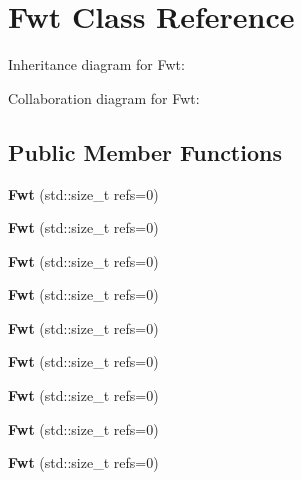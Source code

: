 \hypertarget{class_fwt}{}\section{Fwt Class Reference}
\label{class_fwt}


Inheritance diagram for Fwt\+:


Collaboration diagram for Fwt\+:
\subsection*{Public Member Functions}
\begin{DoxyCompactItemize}
\item 
\mbox{\label{class_fwt_a35327b5c50d4528169ccc0c241ba09d6}} 
{\bfseries Fwt} (std\+::size\+\_\+t refs=0)
\item 
\mbox{\label{class_fwt_a35327b5c50d4528169ccc0c241ba09d6}} 
{\bfseries Fwt} (std\+::size\+\_\+t refs=0)
\item 
\mbox{\label{class_fwt_a35327b5c50d4528169ccc0c241ba09d6}} 
{\bfseries Fwt} (std\+::size\+\_\+t refs=0)
\item 
\mbox{\label{class_fwt_a35327b5c50d4528169ccc0c241ba09d6}} 
{\bfseries Fwt} (std\+::size\+\_\+t refs=0)
\item 
\mbox{\label{class_fwt_a35327b5c50d4528169ccc0c241ba09d6}} 
{\bfseries Fwt} (std\+::size\+\_\+t refs=0)
\item 
\mbox{\label{class_fwt_a35327b5c50d4528169ccc0c241ba09d6}} 
{\bfseries Fwt} (std\+::size\+\_\+t refs=0)
\item 
\mbox{\label{class_fwt_a35327b5c50d4528169ccc0c241ba09d6}} 
{\bfseries Fwt} (std\+::size\+\_\+t refs=0)
\item 
\mbox{\label{class_fwt_a35327b5c50d4528169ccc0c241ba09d6}} 
{\bfseries Fwt} (std\+::size\+\_\+t refs=0)
\item 
\mbox{\label{class_fwt_a35327b5c50d4528169ccc0c241ba09d6}} 
{\bfseries Fwt} (std\+::size\+\_\+t refs=0)
\item 
\mbox{\label{class_fwt_a7db10f89a88f66e80260857ae61b7ef4}} 

\end{DoxyCompactItemize}
